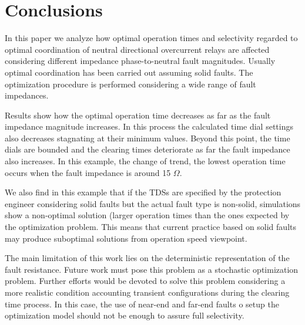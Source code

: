 \documentclass[letterpaper, 10 pt, conference]{IEEEtran}
\begin{document}
\section{Conclusions} \label{conclusions}

In this paper we analyze how optimal operation times and selectivity regarded to optimal coordination of  neutral directional overcurrent relays are affected considering different impedance phase-to-neutral fault magnitudes. Usually optimal coordination has been carried out assuming solid faults. The optimization procedure is performed considering a wide range of fault impedances.

Results show how the optimal operation time decreases as far as the fault impedance magnitude increases. In this process the calculated time dial settings also decreases stagnating at their minimum values. Beyond this point, the time dials are bounded and the clearing times deteriorate as far the fault impedance also increases. In this example, the change of trend, the lowest operation time occurs when the fault impedance is around 15 $\Omega$.

We also find in this example that if the TDSs are specified by the protection engineer considering solid faults but the actual fault type is non-solid, simulations show a non-optimal solution (larger operation times than the ones expected by the optimization problem. This means that current practice based on solid faults may produce suboptimal solutions from operation speed viewpoint.

The main limitation of this work lies on the deterministic representation of the fault resistance. Future work must pose this problem as a stochastic optimization problem. Further efforts would be devoted to solve this problem considering a more realistic condition accounting transient configurations during the clearing time process. In this case, the use of near-end and far-end faults o setup the optimization model should not be enough to assure full selectivity.
\end{document}
